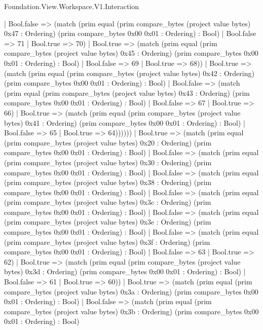 \begin{lexlean}{Foundation.View.Workspace.V1.Interaction}
\begin{semanticmodule}
{                  | Bool.false => (match (prim equal (prim compare_bytes (project value bytes) 0x47 : Ordering) (prim compare_bytes 0x00 0x01 : Ordering) : Bool)
                    | Bool.false => 71
                    | Bool.true => 70)
                  | Bool.true => (match (prim equal (prim compare_bytes (project value bytes) 0x45 : Ordering) (prim compare_bytes 0x00 0x01 : Ordering) : Bool)
                    | Bool.false => 69
                    | Bool.true => 68))
                | Bool.true => (match (prim equal (prim compare_bytes (project value bytes) 0x42 : Ordering) (prim compare_bytes 0x00 0x01 : Ordering) : Bool)
                  | Bool.false => (match (prim equal (prim compare_bytes (project value bytes) 0x43 : Ordering) (prim compare_bytes 0x00 0x01 : Ordering) : Bool)
                    | Bool.false => 67
                    | Bool.true => 66)
                  | Bool.true => (match (prim equal (prim compare_bytes (project value bytes) 0x41 : Ordering) (prim compare_bytes 0x00 0x01 : Ordering) : Bool)
                    | Bool.false => 65
                    | Bool.true => 64))))))
        | Bool.true => (match (prim equal (prim compare_bytes (project value bytes) 0x20 : Ordering) (prim compare_bytes 0x00 0x01 : Ordering) : Bool)
          | Bool.false => (match (prim equal (prim compare_bytes (project value bytes) 0x30 : Ordering) (prim compare_bytes 0x00 0x01 : Ordering) : Bool)
            | Bool.false => (match (prim equal (prim compare_bytes (project value bytes) 0x38 : Ordering) (prim compare_bytes 0x00 0x01 : Ordering) : Bool)
              | Bool.false => (match (prim equal (prim compare_bytes (project value bytes) 0x3c : Ordering) (prim compare_bytes 0x00 0x01 : Ordering) : Bool)
                | Bool.false => (match (prim equal (prim compare_bytes (project value bytes) 0x3e : Ordering) (prim compare_bytes 0x00 0x01 : Ordering) : Bool)
                  | Bool.false => (match (prim equal (prim compare_bytes (project value bytes) 0x3f : Ordering) (prim compare_bytes 0x00 0x01 : Ordering) : Bool)
                    | Bool.false => 63
                    | Bool.true => 62)
                  | Bool.true => (match (prim equal (prim compare_bytes (project value bytes) 0x3d : Ordering) (prim compare_bytes 0x00 0x01 : Ordering) : Bool)
                    | Bool.false => 61
                    | Bool.true => 60))
                | Bool.true => (match (prim equal (prim compare_bytes (project value bytes) 0x3a : Ordering) (prim compare_bytes 0x00 0x01 : Ordering) : Bool)
                  | Bool.false => (match (prim equal (prim compare_bytes (project value bytes) 0x3b : Ordering) (prim compare_bytes 0x00 0x01 : Ordering) : Bool)
}
\end{semanticmodule}
\end{lexlean}
